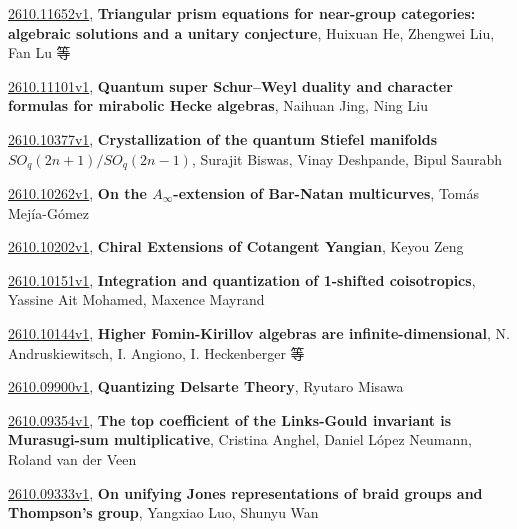 \documentclass[9pt, a4paper]{article}
\theoremstyle{plain}
\theoremstyle{definition}
\theoremstyle{remark}
\newcommand{\arxiv}[3]{\href{https://arxiv.org/abs/#1}{#1}, \textbf{\textcolor{arxivblue}{#2}}, #3}
\begin{document}
\arxiv{2610.11652v1}{Triangular prism equations for near-group categories: algebraic solutions and a unitary conjecture}{Huixuan He, Zhengwei Liu, Fan Lu 等}

\arxiv{2610.11101v1}{Quantum super Schur--Weyl duality and character formulas for mirabolic Hecke algebras}{Naihuan Jing, Ning Liu}

\arxiv{2610.10377v1}{Crystallization of the quantum Stiefel manifolds $SO_q(2n+1)/SO_q(2n-1)$}{Surajit Biswas, Vinay Deshpande, Bipul Saurabh}

\arxiv{2610.10262v1}{On the $A_\infty$-extension of Bar-Natan multicurves}{Tomás Mejía-Gómez}

\arxiv{2610.10202v1}{Chiral Extensions of Cotangent Yangian}{Keyou Zeng}

\arxiv{2610.10151v1}{Integration and quantization of 1-shifted coisotropics}{Yassine Ait Mohamed, Maxence Mayrand}

\arxiv{2610.10144v1}{Higher Fomin-Kirillov algebras are infinite-dimensional}{N. Andruskiewitsch, I. Angiono, I. Heckenberger 等}

\arxiv{2610.09900v1}{Quantizing Delsarte Theory}{Ryutaro Misawa}

\arxiv{2610.09354v1}{The top coefficient of the Links-Gould invariant is Murasugi-sum multiplicative}{Cristina Anghel, Daniel López Neumann, Roland van der Veen}

\arxiv{2610.09333v1}{On unifying Jones representations of braid groups and Thompson's group}{Yangxiao Luo, Shunyu Wan}

\end{document}
